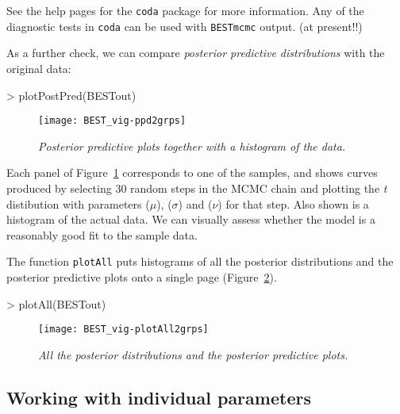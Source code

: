 \documentclass[a4paper]{article}
\begin{document}
See the help pages for the \texttt{coda} package for more information. Any of the diagnostic tests in \texttt{coda} can be used with \texttt{BESTmcmc} output. (at present!!)

\bigskip
As a further check, we can compare \emph{posterior predictive distributions} with the original data:

\begin{Schunk}
\begin{Sinput}
> plotPostPred(BESTout)
\end{Sinput}
\end{Schunk}
\begin{figure}[H]
  \centering
  \texttt{[image: BEST\_vig-ppd2grps]}
  \caption{\it Posterior predictive plots together with a histogram of the data.}
  \label{fig:ppd2g}
\end{figure}

Each panel of Figure~\ref{fig:ppd2g} corresponds to one of the samples, and shows curves produced by selecting 30 random steps in the MCMC chain and plotting the \emph{t} distibution with parameters ($\mu$), ($\sigma$) and ($\nu$) for that step. Also shown is a histogram of the actual data. We can visually assess whether the model is a reasonably good fit to the sample data.

The function \texttt{plotAll} puts histograms of all the posterior distributions and the posterior predictive plots onto a single page (Figure~\ref{fig:plotAll2g}).

\begin{Schunk}
\begin{Sinput}
> plotAll(BESTout)
\end{Sinput}
\end{Schunk}
\begin{figure}[bht]
  \label{fig:plotAll2g}
  \centering
  \texttt{[image: BEST\_vig-plotAll2grps]}
  \caption{\it All the posterior distributions and the posterior predictive plots.}
\end{figure}



\subsection{Working with individual parameters}
\label{subsec:attach2g}
\end{document}
